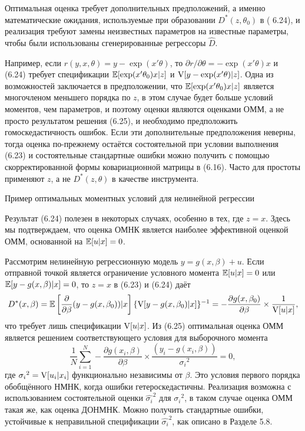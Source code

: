 Оптимальная оценка требует дополнительных предположений, а именно математические ожидания, используемые при образовании $D^*(z,\theta_0)$ в ( 6.24), и реализация требуют замены неизвестных параметров на известные параметры, чтобы были использованы сгенерированные регрессоры $\hat{D}$.

Например, если $r(y,x,\theta)=y-\exp(x'\theta)$, то $\partial r / \partial \theta = -\exp(x'\theta)x$ и (6.24) требует спецификации $\mathbb{E}[\exp(x'\theta_0)x|z]$ и $\mathrm{V}[y-\exp(x'\theta)|z]$. Одна из возможностей заключается в предположении, что $\mathbb{E}[\exp(x'\theta_0)x|z]$ является многочленом меньшего порядка по $z$, в этом случае будет больше условий моментов, чем параметров, и поэтому оценки являются оценками ОММ, а не просто результатом решения (6.25), и необходимо предположить гомоскедастичность ошибок. Если эти дополнительные предположения неверны, тогда оценка по-прежнему остаётся состоятельной при условии выполнения (6.23) и состоятельные стандартные ошибки можно получить с помощью скорректированной формы ковариационной матрицы в (6.16). Часто для простоты применяют $z$, а не $D^*(z,\theta)$ в качестве инструмента.

\begin{center}
Пример оптимальных моментных условий для нелинейной регрессии 
\end{center}

Результат (6.24) полезен в некоторых случаях, особенно в тех, где $z=x$. Здесь мы подтверждаем,
что оценка ОМНК является наиболее эффективной оценкой ОММ, основанной на $\mathbb{E}[u|x]=0$.

Рассмотрим нелинейную регрессионную модель $y=g(x,\beta)+u$. Если отправной точкой является ограничение условного момента $\mathbb{E}[u|x]=0$ или $\mathbb{E}[y-g(x,\beta)|x]=0$, то $z=x$ в (6.23) и (6.24) даёт
\[
D^*(x,\beta)=\mathbb{E} \left[ \frac{\partial}{ \partial \beta} (y- g(x,\beta_0))|x \right] \{ \mathrm{V}[y-g(x,\beta_0)|x] \}^{-1}=-\frac{\partial g(x,\beta_0)}{\partial \beta} \times \frac{1}{\mathrm{V}[u|x]},
\]
что требует лишь спецификации $\mathrm{V}[u|x]$. Из (6.25) оптимальная оценка ОММ является решением соответствующего условия для выборочного момента
\[
\frac{1}{N} \sum_{i=1}^{N} - \frac{\partial g(x_i,\beta)}{\partial \beta} \times \frac{(y_i-g(x_i,\beta))}{{\sigma_i}^2}=0,
\]
где ${\sigma_i}^2=\mathrm{V}[u_i|x_i]$ функционально независимы от $\beta$. Это условия первого порядка обобщённого НМНК, когда ошибки гетероскедастичны. Реализация возможна с использованием состоятельной оценки ${\hat{\sigma_i}}^2$ для ${\sigma_i}^2$, в таком случае оценка ОММ такая же, как оценка ДОНМНК. Можно получить стандартные ошибки, устойчивые к неправильной спецификации ${\hat{\sigma_i}}^2$, как описано в Разделе 5.8.


